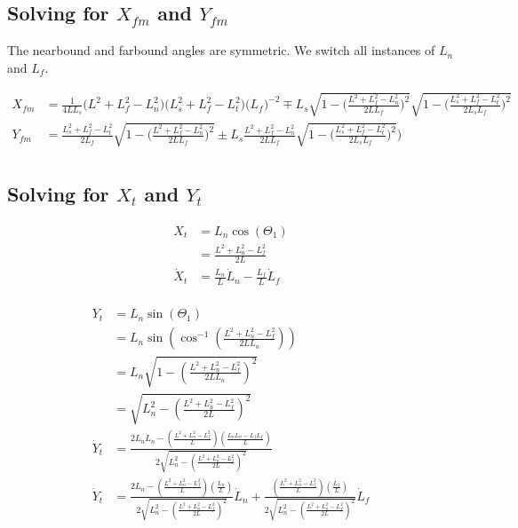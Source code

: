 \documentclass[11pt, landscape]{article}
\begin{document}
\subsection{Solving for $X_{fm}$ and $Y_{fm}$}
The nearbound and farbound angles are symmetric. We switch all instances of $L_n$ and $L_f$.

\begin{align}
  X_{fm} &= \frac{1}{4LL_s}\Big(L^2+L_{f}^2-L_{n}^2\Big)\Big(L_{s}^2+L_{f}^2-L_{t}^2\Big)\big(L_f \big)^{-2} \mp L_s\sqrt{1-\bigg(\frac{L^2+L_{f}^2-L_{n}^2}{2LL_{f}}\bigg)^2}\sqrt{1-\bigg(\frac{L_{s}^2+L_{f}^2-L_{t}^2}{2L_{s}L_{f}}\bigg)^2}\\
  Y_{fm} &= \frac{L_{s}^2+L_{f}^2-L_{t}^2}{2L_{f}}\sqrt{1-\bigg(\frac{L^2+L_{f}^2-L_{n}^2}{2LL_{f}}\bigg)^2} \pm L_s\frac{L^2+L_{f}^2-L_{n}^2}{2LL_{f}}\sqrt{1-\bigg(\frac{L_{s}^2+L_{f}^2-L_{t}^2}{2L_{s}L_{f}}\bigg)^2} \Bigg)\\
\end{align}

\subsection{Solving for $X_t$ and $Y_t$}

\begin{align}
  X_{t} &= L_n\cos(\Theta_{1}) \\
  &= \frac{L^2+L_n^2-L_f^2}{2L} \\
  \dot{X}_t &= \frac{L_n}{L}\dot{L}_n - \frac{L_f}{L}\dot{L}_f\\
\end{align}

\begin{align}
  Y_{t} &= L_n\sin(\Theta_{1}) \\
  &= L_n\sin\left(\cos^{-1}\left(\frac{L^2+L_n^2-L_f^2}{2LL_n}\right)\right) \\
  &= L_n\sqrt{1 - \left(\frac{L^2+L_n^2-L_f^2}{2LL_n}\right)^2} \\
  &= \sqrt{L_n^2 - \left(\frac{L^2+L_n^2-L_f^2}{2L}\right)^2} \\
  \dot{Y}_t &= \frac{2L_n\dot{L}_n - \left(\frac{L^2+L_n^2-L_f^2}{L}\right)\left(\frac{L_n\dot{L}_n - L_f\dot{L}_f}{L}\right)}{2\sqrt{L_n^2 - \left(\frac{L^2+L_n^2-L_f^2}{2L}\right)^2}}\\
  \dot{Y}_t &= \frac{2L_n - \left(\frac{L^2+L_n^2-L_f^2}{L}\right)\left(\frac{L_n}{L}\right)}{2\sqrt{L_n^2 - \left(\frac{L^2+L_n^2-L_f^2}{2L}\right)^2}}\dot{L}_n +
  \frac{\left(\frac{L^2+L_n^2-L_f^2}{L}\right)\left(\frac{L_f}{L}\right)}{2\sqrt{L_n^2 - \left(\frac{L^2+L_n^2-L_f^2}{2L}\right)^2}}\dot{L}_f\\
\end{align}
\end{document}
